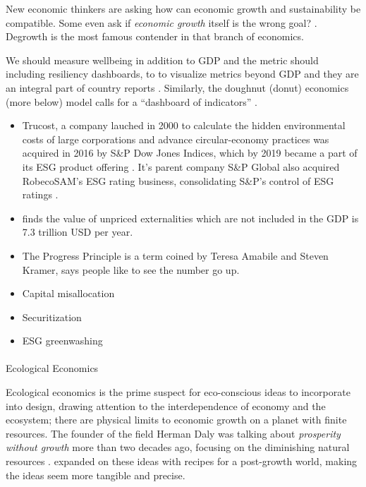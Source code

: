 \documentclass[
  letterpaper,
  DIV=11,
  numbers=noendperiod]{scrartcl}
\makeatletter
\let\oldparagraph\paragraph
\renewcommand{\paragraph}{
    \@ifstar
      \xxxParagraphStar
      \xxxParagraphNoStar
  }
\newcommand{\xxxParagraphStar}[1]{\oldparagraph*{#1}\mbox{}}
\newcommand{\xxxParagraphNoStar}[1]{\oldparagraph{#1}\mbox{}}
\makeatother
\begin{document}
New economic thinkers are asking how can economic growth and
sustainability be compatible. Some even ask if \emph{economic growth}
itself is the wrong goal? \citep{diduchEconomicGrowthWrong2020}.
Degrowth is the most famous contender in that branch of economics.

We should measure wellbeing in addition to GDP and the metric should
including resiliency dashboards, to to visualize metrics beyond GDP and
they are an integral part of country reports
\citep{greensefaBeyondGrowthChangingGoal2023}. Similarly, the doughnut
(donut) economics (more below) model calls for a ``dashboard of
indicators'' \citep{tedHealthyEconomyShould2018}.

\begin{itemize}
\item
  Trucost, a company lauched in 2000 to calculate the hidden
  environmental costs of large corporations and advance circular-economy
  practices was acquired in 2016 by S\&P Dow Jones Indices, which by
  2019 became a part of its ESG product offering
  \citep{toffelTrucostValuingCorporate2011, mikehowerTrucostTruValueLabs2015, indicesDowJonesIndices2016, RollsOutTrucost2019}.
  It's parent company S\&P Global also acquired RobecoSAM's ESG rating
  business, consolidating S\&P's control of ESG ratings
  \citep{georgegeddesGlobalAcquiresRobecoSAM2019}.
\item
  \citep{trucostNaturalCapitalRisk2023} finds the value of unpriced
  externalities which are not included in the GDP is 7.3 trillion USD
  per year.
\item
  The Progress Principle is a term coined by Teresa Amabile and Steven
  Kramer, says people like to see the number go up.
  \citet{amabileProgressPrincipleUsing2011}
\item
  Capital misallocation
\item
  Securitization
\item
  ESG greenwashing \citet{baldiRoleESGScoring2022}
\end{itemize}

\paragraph{Ecological Economics}\label{ecological-economics}

Ecological economics is the prime suspect for eco-conscious ideas to
incorporate into design, drawing attention to the interdependence of
economy and the ecosystem; there are physical limits to economic growth
on a planet with finite resources. The founder of the field Herman Daly
was talking about \emph{prosperity without growth} more than two decades
ago, focusing on the diminishing natural resources
\citep{dalyGrowthEconomicsSustainable1997}.
\citep{jacksonProsperityGrowthEconomics2009, jacksonProsperityGrowthFoundations2017}
expanded on these ideas with recipes for a post-growth world, making the
ideas seem more tangible and precise.
\end{document}
